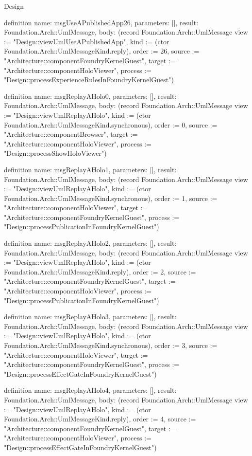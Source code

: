 \begin{lexlean}{Design}
\begin{semanticmodule}
definition{
  name: msgUseAPublishedApp26,
  parameters: [],
  result: Foundation.Arch::UmlMessage,
  body: (record Foundation.Arch::UmlMessage {view := "Design::viewUmlUseAPublishedApp", kind := (ctor Foundation.Arch::UmlMessageKind.reply), order := 26, source := "Architecture::componentFoundryKernelGuest", target := "Architecture::componentHoloViewer", process := "Design::processExperienceRulesInFoundryKernelGuest"})
}

definition{
  name: msgReplayAHolo0,
  parameters: [],
  result: Foundation.Arch::UmlMessage,
  body: (record Foundation.Arch::UmlMessage {view := "Design::viewUmlReplayAHolo", kind := (ctor Foundation.Arch::UmlMessageKind.synchronous), order := 0, source := "Architecture::componentBrowser", target := "Architecture::componentHoloViewer", process := "Design::processShowHoloViewer"})
}

definition{
  name: msgReplayAHolo1,
  parameters: [],
  result: Foundation.Arch::UmlMessage,
  body: (record Foundation.Arch::UmlMessage {view := "Design::viewUmlReplayAHolo", kind := (ctor Foundation.Arch::UmlMessageKind.synchronous), order := 1, source := "Architecture::componentHoloViewer", target := "Architecture::componentFoundryKernelGuest", process := "Design::processPublicationInFoundryKernelGuest"})
}

definition{
  name: msgReplayAHolo2,
  parameters: [],
  result: Foundation.Arch::UmlMessage,
  body: (record Foundation.Arch::UmlMessage {view := "Design::viewUmlReplayAHolo", kind := (ctor Foundation.Arch::UmlMessageKind.reply), order := 2, source := "Architecture::componentFoundryKernelGuest", target := "Architecture::componentHoloViewer", process := "Design::processPublicationInFoundryKernelGuest"})
}

definition{
  name: msgReplayAHolo3,
  parameters: [],
  result: Foundation.Arch::UmlMessage,
  body: (record Foundation.Arch::UmlMessage {view := "Design::viewUmlReplayAHolo", kind := (ctor Foundation.Arch::UmlMessageKind.synchronous), order := 3, source := "Architecture::componentHoloViewer", target := "Architecture::componentFoundryKernelGuest", process := "Design::processEffectGateInFoundryKernelGuest"})
}

definition{
  name: msgReplayAHolo4,
  parameters: [],
  result: Foundation.Arch::UmlMessage,
  body: (record Foundation.Arch::UmlMessage {view := "Design::viewUmlReplayAHolo", kind := (ctor Foundation.Arch::UmlMessageKind.reply), order := 4, source := "Architecture::componentFoundryKernelGuest", target := "Architecture::componentHoloViewer", process := "Design::processEffectGateInFoundryKernelGuest"})
}


\end{semanticmodule}
\end{lexlean}
